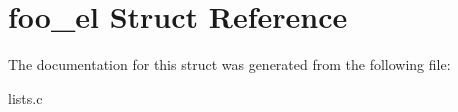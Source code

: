 \hypertarget{structfoo__el}{}\section{foo\+\_\+el Struct Reference}
\label{structfoo__el}


The documentation for this struct was generated from the following file\+:\begin{DoxyCompactItemize}
\item 
lists.\+c\end{DoxyCompactItemize}
